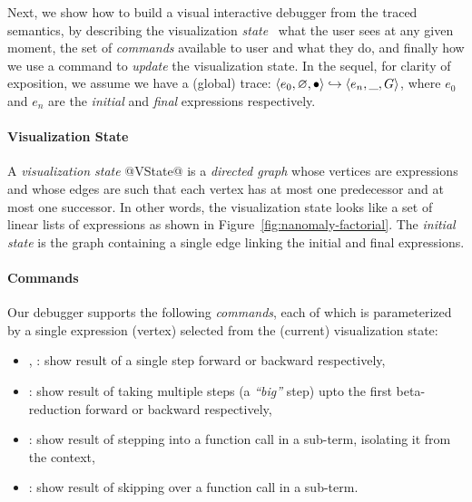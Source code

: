 Next, we show how to build a visual interactive debugger
from the traced semantics, by describing the visualization
\emph{state} \ie\ what the user sees at any given moment,
the set of \emph{commands} available to user and what
they do, and finally how we use a command to \emph{update}
the visualization state. In the sequel, for clarity of
exposition, we assume we have a (global) trace:
$\langle e_0, \varnothing, \bullet \rangle \hookrightarrow \langle e_n, \_, G \rangle$, where
$e_0$ and $e_n$ are the \emph{initial} and \emph{final}
expressions respectively.

\paragraph{Visualization State}
%
A \emph{visualization state} @VState@ is a \emph{directed graph}
whose vertices are expressions and whose edges are such
that each vertex has at most one predecessor and at most one
successor. In other words, the visualization state looks
like a set of linear lists of expressions as shown in Figure~\ref{fig:nanomaly-factorial}.
%
The \emph{initial state} is the graph containing a single
edge linking the initial and final expressions.

\paragraph{Commands}
Our debugger supports the following \emph{commands}, each of which
is parameterized by a single expression (vertex) selected from the
(current) visualization state:
%
\begin{itemize}
%
\item \stepforwardsym, \stepbackwardsym:
      show result of a single step forward or backward respectively,
%
\item \jumpforwardsym:
      show result of taking multiple steps (a \emph{``big''} step)
      upto the first beta-reduction forward or backward respectively,
%
\item \stepintosym:
      show result of stepping into a function call in a sub-term,
      isolating it from the context,

\item \stepoversym:
      show result of skipping over a function call in a sub-term.
\end{itemize}




